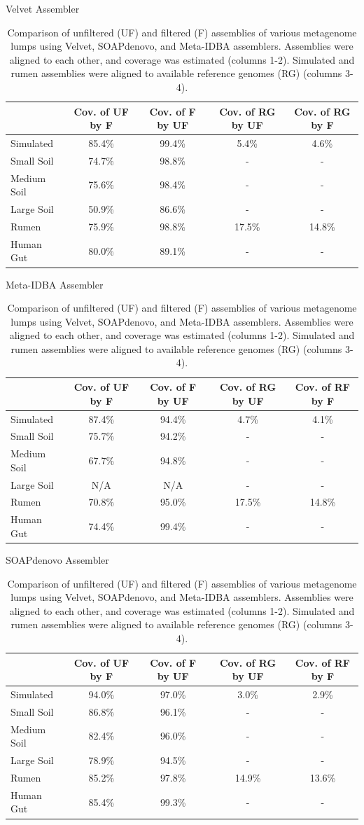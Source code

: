 \documentclass[10pt]{article}
\begin{document}
\begin{table}[h]
\caption{Comparison of unfiltered (UF) and filtered (F) assemblies of various metagenome lumps using Velvet, SOAPdenovo, and Meta-IDBA assemblers.  Assemblies were aligned to each other, and coverage was estimated (columns 1-2).  Simulated and rumen assemblies were aligned to available reference genomes (RG) (columns 3-4).}
Velvet Assembler  \\
\begin{tabular}{l c c c c}
\hline
& Cov. of UF by F & Cov. of F by UF  & Cov. of RG  by UF  & Cov. of RG by F \\
\hline
Simulated		&85.4\%		&99.4\%		&5.4\%	&4.6\%\\
Small Soil		&74.7\%		&98.8\%		&-		&-\\
Medium Soil	&75.6\%		&98.4\%		&-		&-\\
Large Soil		&50.9\%		&86.6\%		&-		&-\\
Rumen		&75.9\%		&98.8\%		&17.5\%	&14.8\%\\
Human Gut 	&80.0\%		&89.1\%		&-		&-\\
\end{tabular}
\medskip
Meta-IDBA Assembler  \\
\begin{tabular}{l c c c c}
\hline
& Cov. of UF by F & Cov. of F by UF  & Cov. of RG  by UF  & Cov. of RF by F \\
\hline
Simulated		&87.4\%		&94.4\%		&4.7\%	&4.1\%\\
Small Soil		&75.7\%		&94.2\%		&-		&-\\
Medium Soil	&67.7\%		&94.8\%		&-		&-\\
Large Soil		&N/A			&N/A			&-		&-\\
Rumen		&70.8\%		&95.0\%		&17.5\%	&14.8\%\\
Human Gut 	&74.4\%		&99.4\%		&-		&-\\
\end{tabular}
\medskip
SOAPdenovo Assembler \\   
\begin{tabular}{l c c c c}
\hline
& Cov. of UF by F & Cov. of F by UF  & Cov. of RG  by UF  & Cov. of RF by F \\
\hline
Simulated		&94.0\%		&97.0\%		&3.0\%	&2.9\%\\
Small Soil		&86.8\%		&96.1\%		&-		&-\\
Medium Soil	&82.4\%		&96.0\%		&-		&-\\
Large Soil		&78.9\%		&94.5\%		&-		&-\\
Rumen		&85.2\%		&97.8\%		&14.9\%	&13.6\%\\
Human Gut 	&85.4\%		&99.3\%		&-		&-\\
\end{tabular}
\label{assembly-compare}
\end{table}
\end{document}
